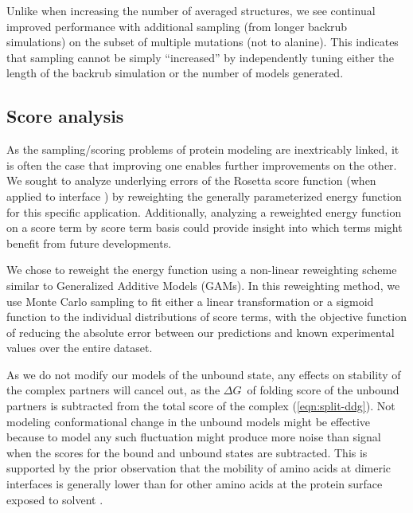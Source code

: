 Unlike when increasing the number of averaged structures, we see continual improved performance with additional sampling (from longer backrub simulations) on the subset of multiple mutations (not to alanine).
This indicates that sampling cannot be simply ``increased'' by independently tuning either the length of the backrub simulation or the number of models generated. %

\subsection{Score analysis}

As the sampling/scoring problems of protein modeling are inextricably linked, it is often the case that improving one enables further improvements on the other.
We sought to analyze underlying errors of the Rosetta score function (when applied to interface \ddg) by reweighting the generally parameterized energy function for this specific application.
Additionally, analyzing a reweighted energy function on a score term by score term basis could provide insight into which terms might benefit from future developments.

We chose to reweight the energy function using a non-linear reweighting scheme similar to Generalized Additive Models (GAMs)\cite{wood_fast_2011}.
In this reweighting method, we use Monte Carlo sampling to fit either a linear transformation or a sigmoid function to the individual distributions of score terms, with the objective function of reducing the absolute error between our predictions and known experimental values over the entire dataset.

As we do not modify our models of the unbound state, any effects on stability of the complex partners will cancel out, as the $\Delta G$\ of folding score of the unbound partners is subtracted from the total score of the complex (\cref{eqn:split-ddg}).
Not modeling conformational change in the unbound models might be effective because to model any such fluctuation might produce more noise than signal when the scores for the bound and unbound states are subtracted.
This is supported by the prior observation that the mobility of amino acids at dimeric interfaces is generally lower than for other amino acids at the protein surface exposed to solvent \cite{zen_comparing_2010}.

